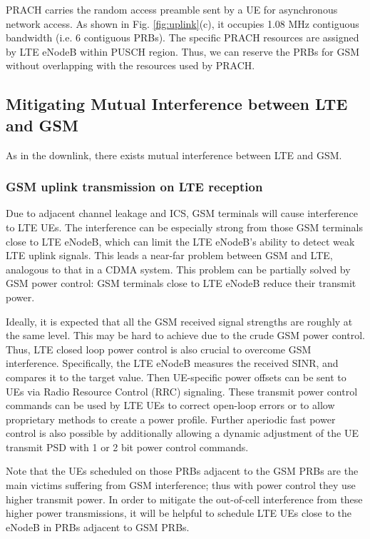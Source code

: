 \documentclass[10pt,journal]{IEEEtran}
\theoremstyle{slplain}
\begin{document}
PRACH carries the random access preamble sent by a UE for asynchronous network access. As shown in Fig. \ref{fig:uplink}(c), it occupies 1.08 MHz  contiguous bandwidth (i.e. 6 contiguous PRBs). The specific PRACH resources are assigned by LTE eNodeB within PUSCH region. Thus, we can reserve the PRBs for GSM without overlapping with the resources used by PRACH.




\subsection{Mitigating Mutual Interference between LTE and GSM}

As in the downlink, there exists mutual interference between LTE and GSM. 

\subsubsection{GSM uplink transmission on LTE reception}

Due to adjacent channel leakage and ICS, GSM terminals will cause interference to LTE UEs. The interference can be especially strong from those GSM terminals close to LTE eNodeB, which can limit the LTE eNodeB's ability to detect weak LTE uplink signals. This leads a near-far problem between GSM and LTE, analogous to that in a CDMA system. This problem can be partially solved by GSM power control: GSM terminals close to LTE eNodeB reduce their transmit power.

Ideally, it is expected that all the GSM received signal strengths are roughly at the same level. This may  be hard to achieve due to the crude GSM power control. Thus, LTE closed loop power control is also crucial to overcome GSM interference. Specifically, the LTE eNodeB measures the received SINR, and compares it to the target value. Then UE-specific power offsets can be sent to UEs via Radio Resource Control (RRC) signaling. These transmit power control commands can be used by LTE UEs to correct open-loop errors or to allow proprietary methods to create a power profile. Further aperiodic fast power control is also possible by additionally allowing a dynamic adjustment of the UE transmit PSD with 1 or 2 bit power control commands.


Note that the UEs scheduled on those PRBs adjacent to the GSM PRBs are the main victims suffering from GSM interference; thus with power control they use higher transmit power. In order to mitigate the out-of-cell interference from these higher power transmissions, it will be helpful to schedule LTE UEs close to the eNodeB in PRBs adjacent to GSM PRBs. 
\end{document}
